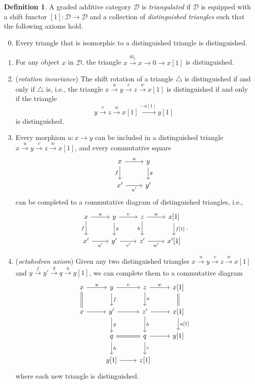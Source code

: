 \documentclass[10pt,letterpaper,cm]{nupset}
\theoremstyle{definition}
\newtheorem{definition}{Definition}[subsection]
\theoremstyle{theorem}
\theoremstyle{remark}
\newcommand{\1}{\mathbf{1}}
\renewcommand{\d}{\mathscr{D}}
\newcommand{\0}{\vec 0}
\DeclareMathOperator{\id}{id}
\begin{document}
\begin{definition}
A graded additive category $\d$ is \textit{triangulated} if $\d$ is equipped with a shift functor $[1] : \d \to \d$ and a collection of \textit{distinguished triangles} such that the following axioms hold.
\begin{enumerate}[label=(\arabic*)]
\setcounter{enumi}{-1}
\item Every triangle that is isomorphic to a distinguished triangle is distinguished. 
\item For any object $x$ in $\d$, the triangle $x \overset{\id_x}{\longrightarrow} x \to 0 \to x[1]$ is distinguished.
\item (\textit{rotation invariance}) The shift rotation of a triangle $\triangle$ is distinguished if and only if $\triangle$ is, i.e., the triangle $x\overset{u}{\longrightarrow} y\overset{v}{\longrightarrow}z \overset{w}{\longrightarrow}  x[1]$ is distinguished if and only if the triangle $$ y\overset{v}{\longrightarrow}z \overset{w}{\longrightarrow}  x[1] \overset{{-}u[1]}{\longrightarrow} y[1]$$  is distinguished. 
\item Every morphism $u : x \to y$ can be included in a distinguished triangle $x\overset{u}{\longrightarrow} y\overset{v}{\longrightarrow}z \overset{w}{\longrightarrow}  x[1]$, and every commutative square 
\[
\begin{tikzcd}
x \arrow[r, "u"] \arrow[d, "f"'] & y \arrow[d, "g"] \\
x' \arrow[r, "u'"']              & y'              
\end{tikzcd}
\]
can be completed to a commutative diagram of distinguished triangles, i.e., 
\[
\begin{tikzcd}
x \arrow[r, "u"] \arrow[d, "f"'] & y \arrow[r, "v"] \arrow[d, "g"] & z \arrow[r, "w"] \arrow[d, "h"'] & {x[1]} \arrow[d, "{f[1]}"] \\
x' \arrow[r, "u'"']              & y' \arrow[r, "v'"']             & z' \arrow[r, "w'"']              & {x'[1]}                   
\end{tikzcd}
.\]
\item (\textit{octahedron axiom}) Given any two distinguished triangles $x\overset{u}{\longrightarrow} y\overset{v}{\longrightarrow}z \overset{w}{\longrightarrow} x[1]$ and $y\overset{f}{\longrightarrow} y'\overset{g}{\longrightarrow}q \overset{h}{\longrightarrow}  y[1]$, we can complete them to a commutative diagram
\[
\begin{tikzcd}
x \arrow[d, equals] \arrow[r, "u"] & y \arrow[d, "f"] \arrow[r, "v"] & z \arrow[d, "a"] \arrow[r, "w"] & {x[1]} \arrow[d, equals]           \\
x \arrow[r]                & y' \arrow[d, "g"] \arrow[r]     & z' \arrow[d, "b"] \arrow[r]     & {x[1]} \arrow[d, "{u[1]}"] \\
                           & q \arrow[r, equals] \arrow[d, "h"]      & q \arrow[r] \arrow[d, "c"]      & {y[1]} \\
                           & {y[1]} \arrow[r]                & {z[1]}               &                     
\end{tikzcd}
\]
where each new triangle is distinguished. 
\end{enumerate}
\end{definition}
\end{document}

